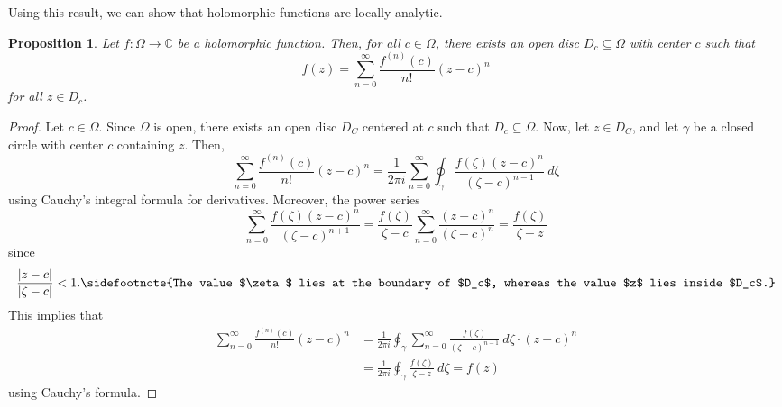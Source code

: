 \documentclass[a4paper, openany]{memoir}
\theoremstyle{definition}
\theoremstyle{plain}
\newtheorem{proposition}[definition]{Proposition}
\begin{document}
Using this result, we can show that holomorphic functions are locally analytic.
\begin{proposition}
Let $f: \Omega \to \mathbb{C}$ be a holomorphic function. Then, for all $c \in \Omega$, there exists an open disc $D_c \subseteq \Omega$ with center $c$ such that
\[f(z) = \sum_{n=0}^\infty \frac{f^{(n)}(c)}{n!} (z - c)^n\]
for all $z \in D_c$.
\end{proposition}
\begin{proof}
Let $c \in \Omega$. Since $\Omega$ is open, there exists an open disc $D_C$ centered at $c$ such that $D_c \subseteq \Omega$. Now, let $z \in D_C$, and let $\gamma$ be a closed circle with center $c$ containing $z$. Then,
\[\sum_{n=0}^\infty \frac{f^{(n)}(c)}{n!} (z - c)^n = \frac{1}{2\pi i} \sum_{n=0}^\infty \oint_\gamma \frac{f(\zeta) (z - c)^n}{(\zeta - c)^{n-1}} \ d\zeta\]
using Cauchy's integral formula for derivatives. Moreover, the power series
\[\sum_{n=0}^\infty \frac{f(\zeta) (z - c)^n}{(\zeta - c)^{n+1}} = \frac{f(\zeta)}{\zeta - c} \sum_{n=0}^\infty \frac{(z - c)^n}{(\zeta - c)^n} = \frac{f(\zeta)}{\zeta - z}\]
since
\[\frac{|z - c|}{|\zeta - c|} < 1.\sidefootnote{The value $\zeta$ lies at the boundary of $D_c$, whereas the value $z$ lies inside $D_c$.}\]
This implies that
\begin{align*}
    \sum_{n=0}^\infty \frac{f^{(n)}(c)}{n!} (z - c)^n &= \frac{1}{2\pi i} \oint_\gamma \sum_{n=0}^\infty \frac{f(\zeta)}{(\zeta - c)^{n-1}} \  d\zeta \cdot (z - c)^n \\
    &= \frac{1}{2\pi i} \oint_\gamma \frac{f(\zeta)}{\zeta - z} \ d\zeta = f(z)
\end{align*}
using Cauchy's formula.
\end{proof}
\end{document}
